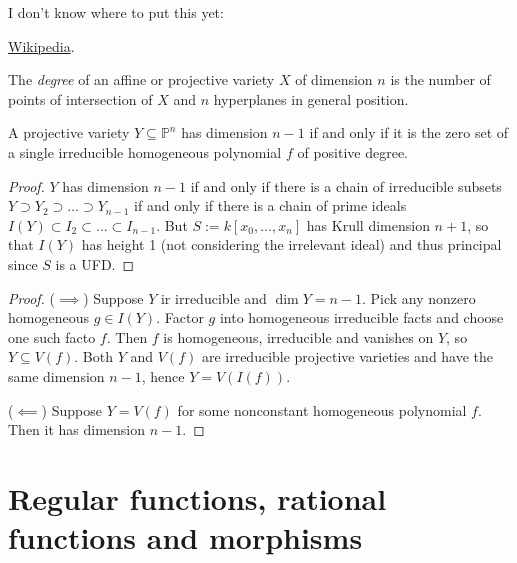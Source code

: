 \documentclass{book}
\begin{document}
\medskip\noindent
I don't know where to put this yet:

\begin{definition}
\label{definition-degree}
\begin{reference}
\href{https://en.wikipedia.org/wiki/%
Degree_of_an_algebraic_variety}{Wikipedia}.
\end{reference}
The {\it degree} of an affine or projective
variety $X$ of dimension $n$ is the number of
points
of intersection of $X$ and $n$ hyperplanes in
general position.
\end{definition}

\begin{exercise}
\label{exercise-hypersurfaces-of-pn}
\begin{reference}
\cite[Exercise I.2.8]{hart}
\end{reference}
A projective variety $Y \subseteq
\mathbb{P}^n$
has dimension $n-1$ if and only if
it is the zero set of a single irreducible
homogeneous polynomial
$f$ of positive degree.
\end{exercise}

\begin{proof}
$Y$ has dimension $n-1$ if and only if there
is a chain
of irreducible subsets $Y \supset Y_2\supset…
\supset Y_{n-1}$
if and only if there is a chain of
prime ideals $I(Y) \subset I_2
\subset…\subset I_{n-1}$.
But $S:=k[x_0,…,x_n]$ has Krull dimension
$n+1$,
so that $I(Y)$ has height 1
(not considering the irrelevant ideal) and
thus principal
since $S$ is a UFD.
\end{proof}

\begin{proof}
($\implies$) Suppose $Y$ ir irreducible
and $\dim Y=n-1$. Pick any nonzero
homogeneous $g \in I(Y)$.
Factor $g$ into homogeneous irreducible
facts and choose one such facto $f$.
Then $f$ is homogeneous, irreducible and
vanishes on $Y$,
so $Y \subseteq V(f)$.
Both $Y$ and $V(f)$ are irreducible
projective
varieties and have the same dimension $n-1$,
hence $Y=V(I(f))$.

($\impliedby$) Suppose $Y=V(f)$ for some
nonconstant homogeneous polynomial $f$.
Then it has dimension $n-1$.
\end{proof}

\section{Regular functions, rational
functions and morphisms}
\label{section-regular-functions}
\end{document}

